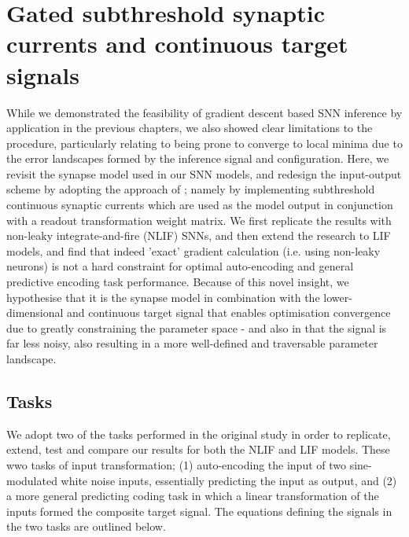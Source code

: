 \documentclass[mphil,deptreport,ianc]{infthesis} %
\begin{document}
\chapter{Gated subthreshold synaptic currents and continuous target signals}\label{chpt:gated_synaptic}

While we demonstrated the feasibility of gradient descent based SNN inference by application in the previous chapters, we also showed clear limitations to the procedure, particularly relating to being prone to converge to local minima due to the error landscapes formed by the inference signal and configuration.
Here, we revisit the synapse model used in our SNN models, and redesign the input-output scheme by adopting the approach of \cite{Huh2017}; namely by implementing subthreshold continuous synaptic currents which are used as the model output in conjunction with a readout transformation weight matrix.
We first replicate the results with non-leaky integrate-and-fire (NLIF) SNNs, and then extend the research to LIF models, and find that indeed 'exact' gradient calculation (i.e. using non-leaky neurons) is not a hard constraint for optimal auto-encoding and general predictive encoding task performance.
Because of this novel insight, we hypothesise that it is the synapse model in combination with the lower-dimensional and continuous target signal that enables optimisation convergence due to greatly constraining the parameter space - and also in that the signal is far less noisy, also resulting in a more well-defined and traversable parameter landscape.


\section{Tasks}

We adopt two of the tasks performed in the original study \cite{Huh2018} in order to replicate, extend, test and compare our results for both the NLIF and LIF models.
These wwo tasks of input transformation; (1) auto-encoding the input of two sine-modulated white noise inputs, essentially predicting the input as output, and (2) a more general predicting coding task in which a linear transformation of the inputs formed the composite target signal. The equations defining the signals in the two tasks are outlined below.
\end{document}
